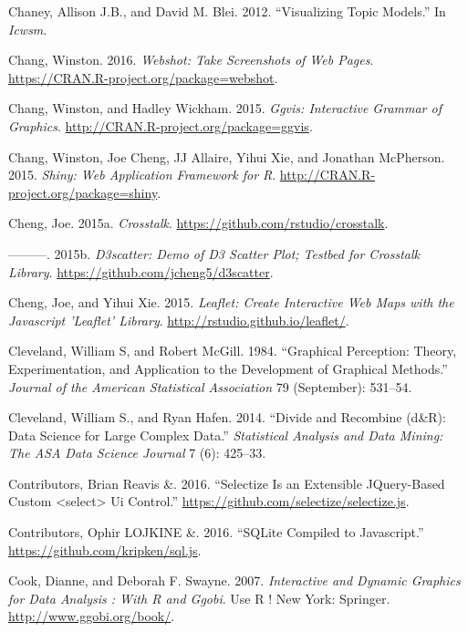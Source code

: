 \documentclass[12pt,]{isuthesis}
\begin{document}
\hypertarget{ref-Blei-2012}{}
Chaney, Allison J.B., and David M. Blei. 2012. ``Visualizing Topic
Models.'' In \emph{Icwsm}.

\hypertarget{ref-webshot}{}
Chang, Winston. 2016. \emph{Webshot: Take Screenshots of Web Pages}.
\url{https://CRAN.R-project.org/package=webshot}.

\hypertarget{ref-ggvis}{}
Chang, Winston, and Hadley Wickham. 2015. \emph{Ggvis: Interactive
Grammar of Graphics}. \url{http://CRAN.R-project.org/package=ggvis}.

\hypertarget{ref-shiny}{}
Chang, Winston, Joe Cheng, JJ Allaire, Yihui Xie, and Jonathan
McPherson. 2015. \emph{Shiny: Web Application Framework for R}.
\url{http://CRAN.R-project.org/package=shiny}.

\hypertarget{ref-crosstalk}{}
Cheng, Joe. 2015a. \emph{Crosstalk}.
\url{https://github.com/rstudio/crosstalk}.

\hypertarget{ref-d3scatter}{}
---------. 2015b. \emph{D3scatter: Demo of D3 Scatter Plot; Testbed for
Crosstalk Library}. \url{https://github.com/jcheng5/d3scatter}.

\hypertarget{ref-leaflet}{}
Cheng, Joe, and Yihui Xie. 2015. \emph{Leaflet: Create Interactive Web
Maps with the Javascript 'Leaflet' Library}.
\url{http://rstudio.github.io/leaflet/}.

\hypertarget{ref-graphical-perception}{}
Cleveland, William S, and Robert McGill. 1984. ``Graphical Perception:
Theory, Experimentation, and Application to the Development of Graphical
Methods.'' \emph{Journal of the American Statistical Association} 79
(September): 531--54.

\hypertarget{ref-divide-recombine}{}
Cleveland, William S., and Ryan Hafen. 2014. ``Divide and Recombine
(d\&R): Data Science for Large Complex Data.'' \emph{Statistical
Analysis and Data Mining: The ASA Data Science Journal} 7 (6): 425--33.

\hypertarget{ref-selectizejs}{}
Contributors, Brian Reavis \&. 2016. ``Selectize Is an Extensible
JQuery-Based Custom \textless{}select\textgreater{} Ui Control.''
\url{https://github.com/selectize/selectize.js}.

\hypertarget{ref-SQLjs}{}
Contributors, Ophir LOJKINE \&. 2016. ``SQLite Compiled to Javascript.''
\url{https://github.com/kripken/sql.js}.

\hypertarget{ref-ggobi:2007}{}
Cook, Dianne, and Deborah F. Swayne. 2007. \emph{Interactive and Dynamic
Graphics for Data Analysis : With R and Ggobi}. Use R ! New York:
Springer. \url{http://www.ggobi.org/book/}.
\end{document}
